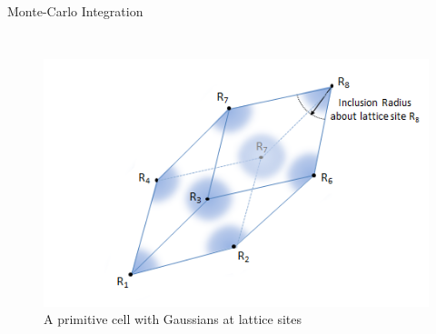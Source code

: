 \documentclass{beamer}
\renewcommand{\vec}[1]{\mathbf{#1}}
\begin{document}
\begin{frame}{Monte-Carlo Integration}
	\begin{columns}[t]
		 \begin{figure}
            \centering
            \includegraphics[width=1.02\columnwidth]{InclusionRadius.png}
            A primitive cell with Gaussians at lattice sites
          \end{figure}
	\end{columns}	

	
\end{frame}




\end{document}
